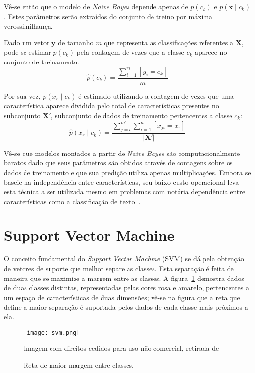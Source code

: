 Vê-se então que o modelo de \textit{Naive Bayes} depende apenas de $p(c_k)$ e $p(\mathbf{x} \mid c_k)$. Estes parâmetros serão extraídos do conjunto de treino por máxima verossimilhança.

Dado um vetor $\mathbf{y}$ de tamanho $m$ que representa as classificações referentes a $\mathbf{X}$, pode-se estimar $p(c_k)$ pela contagem de vezes que a classe $c_k$ aparece no conjunto de treinamento:
\begin{equation}
    \hat{p}(c_k) = \frac{\sum_{i=1}^m [y_i = c_k]}{m}
\end{equation}

Por sua vez, $p(x_r \mid c_k)$ é estimado utilizando a contagem de vezes que uma característica aparece dividida pelo total de características presentes no subconjunto $\mathbf{X'}$, subconjunto de dados de treinamento pertencentes a classe $c_k$:
\begin{equation}
    \hat{p}(x_r \mid c_k) = \frac{\sum_{j=i}^{m'} \sum_{i=1}^n [x_{ji} = x_r]}{|\mathbf{X'}|}
\end{equation}

Vê-se que modelos montados a partir de \textit{Naive Bayes} são computacionalmente baratos dado que seus parâmetros são obtidos através de contagens sobre os dados de treinamento e que sua predição utiliza apenas multiplicações.
Embora se baseie na independência entre características, seu baixo custo operacional leva esta técnica a ser utilizada mesmo em problemas com notória dependência entre características como a classificação de texto~\cite{mccallum98}.

\section{Support Vector Machine}

O conceito fundamental do \textit{Support Vector Machine} (SVM) se dá pela obtenção de vetores de suporte que melhor separe as classes. Esta separação é feita de maneira que se maximize a margem entre as classes. A figura~\ref{fig:svm} demostra dados de duas classes distintas, representadas pelas cores rosa e amarelo, pertencentes a um espaço de características de duas dimensões; vê-se na figura que a reta que define a maior separação é suportada pelos dados de cada classe mais próximos a ela.

\begin{figure}
\begin{center} {
    \begin{center}
    \texttt{[image: svm.png]}
    \caption{Reta de maior margem entre classes.}
    \small Imagem com direitos cedidos para uso não comercial, retirada de~\cite{vanderplas15}
    \label{fig:svm}
    \end{center}
}
\end{center}
\end{figure}

